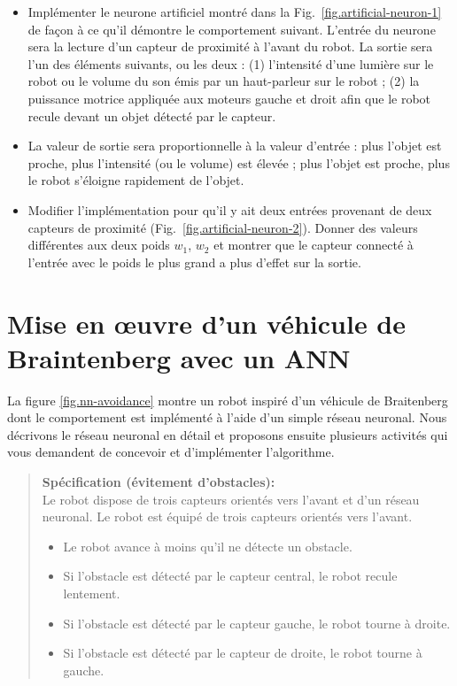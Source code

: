 \begin{framed}
\begin{itemize}
\item Implémenter le neurone artificiel montré dans la Fig.~\ref{fig.artificial-neuron-1} de façon à ce qu'il démontre le comportement suivant. L'entrée du neurone sera la lecture d'un capteur de proximité à l'avant du robot. La sortie sera l'un des éléments suivants, ou les deux : (1) l'intensité d'une lumière sur le robot ou le volume du son émis par un haut-parleur sur le robot ; (2) la puissance motrice appliquée aux moteurs gauche et droit afin que le robot recule devant un objet détecté par le capteur.
\item La valeur de sortie sera proportionnelle à la valeur d'entrée : plus l'objet est proche, plus l'intensité (ou le volume) est élevée ; plus l'objet est proche, plus le robot s'éloigne rapidement de l'objet.
\item Modifier l'implémentation pour qu'il y ait deux entrées provenant de deux capteurs de proximité (Fig.~\ref{fig.artificial-neuron-2}). Donner des valeurs différentes aux deux poids $w_1$, $w_2$ et montrer que le capteur connecté à l'entrée avec le poids le plus grand a plus d'effet sur la sortie.
\end{itemize}
\end{framed}


\section{Mise en œuvre d'un véhicule de Braintenberg avec un ANN}\label{s.braitenberg-ann}

La figure \ref{fig.nn-avoidance} montre un robot inspiré d'un véhicule de Braitenberg dont le comportement est implémenté à l'aide d'un simple réseau neuronal. Nous décrivons le réseau neuronal en détail et proposons ensuite plusieurs activités qui vous demandent de concevoir et d'implémenter l'algorithme.

\begin{quote}
\normalsize
\noindent\textbf{Spécification (évitement d'obstacles):}\\
Le robot dispose de trois capteurs orientés vers l'avant et d'un réseau neuronal.
Le robot est équipé de trois capteurs orientés vers l'avant.
\begin{itemize}
\item Le robot avance à moins qu'il ne détecte un obstacle.
\item Si l'obstacle est détecté par le capteur central, le robot recule lentement.
\item Si l'obstacle est détecté par le capteur gauche, le robot tourne à droite.
\item Si l'obstacle est détecté par le capteur de droite, le robot tourne à gauche.
\end{itemize}
\end{quote}


